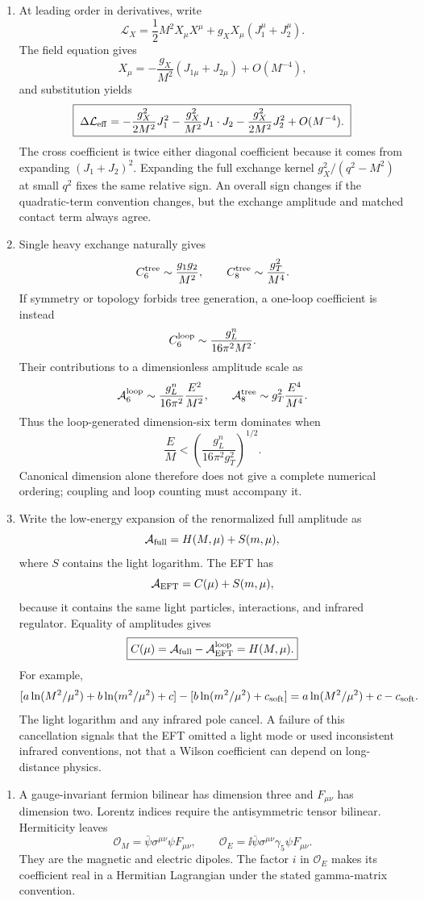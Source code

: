 \begin{enumerate}
\begin{enumerate}
\item
At leading order in derivatives, write
\[
 \mathcal L_X=\frac12M^2X_\mu X^\mu
 +g_XX_\mu(J_1^\mu+J_2^\mu).
\]
The field equation gives
\[
 X_\mu=-\frac{g_X}{M^2}(J_{1\mu}+J_{2\mu})+O(M^{-4}),
\]
and substitution yields
\[
 \boxed{\;
 \Delta\mathcal L_{\rm eff}
 =-\frac{g_X^2}{2M^2}J_1^2
 -\frac{g_X^2}{M^2}J_1\cdot J_2
 -\frac{g_X^2}{2M^2}J_2^2+O(M^{-4}).\;}
\]
The cross coefficient is twice either diagonal coefficient because it
comes from expanding \((J_1+J_2)^2\).  Expanding the full exchange kernel
\(g_X^2/(q^2-M^2)\) at small \(q^2\) fixes the same relative sign.  An
overall sign changes if the quadratic-term convention changes, but the
exchange amplitude and matched contact term always agree.
\item
Single heavy exchange naturally gives
\[
 C_6^{\rm tree}\sim\frac{g_1g_2}{M^2},\qquad
 C_8^{\rm tree}\sim\frac{g_T^2}{M^4}.
\]
If symmetry or topology forbids tree generation, a one-loop coefficient is
instead
\[
 C_6^{\rm loop}\sim
 \frac{g_L^n}{16\pi^2M^2}.
\]
Their contributions to a dimensionless amplitude scale as
\[
 \mathcal A_6^{\rm loop}\sim
 \frac{g_L^n}{16\pi^2}\frac{E^2}{M^2},\qquad
 \mathcal A_8^{\rm tree}\sim
 g_T^2\frac{E^4}{M^4}.
\]
Thus the loop-generated dimension-six term dominates when
\[
 \boxed{\frac EM<
 \left(\frac{g_L^n}{16\pi^2g_T^2}\right)^{1/2}.}
\]
Canonical dimension alone therefore does not give a complete numerical
ordering; coupling and loop counting must accompany it.
\item
Write the low-energy expansion of the renormalized full amplitude as
\[
 \mathcal A_{\rm full}
 =H(M,\mu)+S(m,\mu),
\]
where \(S\) contains the light logarithm.  The EFT has
\[
 \mathcal A_{\rm EFT}=C(\mu)+S(m,\mu),
\]
because it contains the same light particles, interactions, and infrared
regulator.  Equality of amplitudes gives
\[
 \boxed{C(\mu)=\mathcal A_{\rm full}-\mathcal A_{\rm EFT}^{\rm loop}
 =H(M,\mu).}
\]
For example,
\[
 [a\ln(M^2/\mu^2)+b\ln(m^2/\mu^2)+c]
 -[b\ln(m^2/\mu^2)+c_{\rm soft}]
 =a\ln(M^2/\mu^2)+c-c_{\rm soft}.
\]
The light logarithm and any infrared pole cancel.  A failure of this
cancellation signals that the EFT omitted a light mode or used inconsistent
infrared conventions, not that a Wilson coefficient can depend on
long-distance physics.
\end{enumerate}

\begin{enumerate}
\item
A gauge-invariant fermion bilinear has dimension three and
\(F_{\mu\nu}\) has dimension two.  Lorentz indices require the antisymmetric
tensor bilinear.  Hermiticity leaves
\[
 \boxed{\mathcal O_M=\bar\psi\sigma^{\mu\nu}\psi F_{\mu\nu},\qquad
 \mathcal O_E=\ii\bar\psi\sigma^{\mu\nu}\gamma_5\psi F_{\mu\nu}.}
\]
They are the magnetic and electric dipoles.  The factor \(i\) in
\(\mathcal O_E\) makes its coefficient real in a Hermitian Lagrangian under
the stated gamma-matrix convention.


\end{enumerate}
\end{enumerate}
